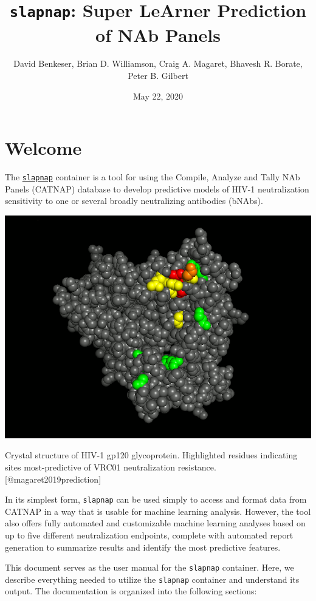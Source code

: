 \documentclass[]{article}
\title{\texttt{slapnap}: Super LeArner Prediction of NAb Panels}
\author{David Benkeser, Brian D. Williamson, Craig A. Magaret, Bhavesh R. Borate, Peter B. Gilbert}
\date{May 22, 2020}
\begin{document}
\maketitle

{
\setcounter{tocdepth}{2}
\tableofcontents
}
\hypertarget{welcome}{%
\section*{Welcome}\label{welcome}}

The \href{https://hub.docker.com/r/slapnap/slapnap}{\texttt{slapnap}} container is a tool for using the Compile, Analyze and Tally NAb Panels (CATNAP) database to develop predictive models of HIV-1 neutralization sensitivity to one or several broadly neutralizing antibodies (bNAbs).

\begin{center}\includegraphics[width=0.7\linewidth]{gp120} \end{center}
\begin{center}
Crystal structure of HIV-1 gp120 glycoprotein. Highlighted residues
indicating sites most-predictive of VRC01 neutralization resistance.
{[}@magaret2019prediction{]}
\end{center}

In its simplest form, \texttt{slapnap} can be used simply to access and format data from CATNAP in a way that is usable for machine learning analysis. However, the tool also offers fully automated and customizable machine learning analyses based on up to five different neutralization endpoints, complete with automated report generation to summarize results and identify the most predictive features.

This document serves as the user manual for the \texttt{slapnap} container. Here, we describe everything needed to utilize the \texttt{slapnap} container and understand its output. The documentation is organized into the following sections:
\end{document}
